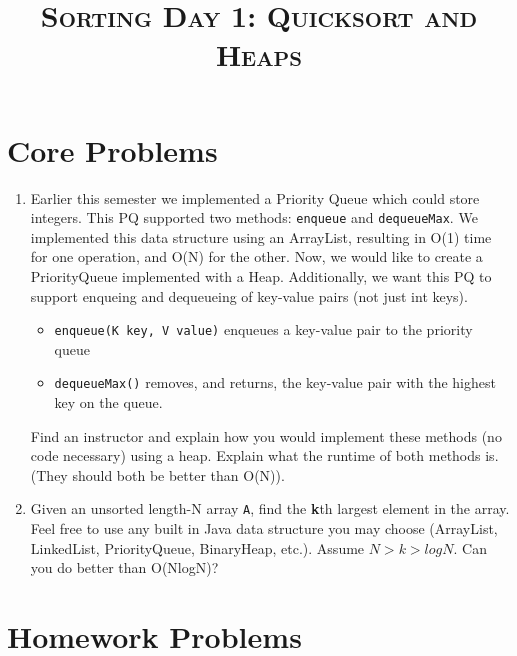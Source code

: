 \documentclass{article}
\title{\large{\textsc{Sorting Day 1: Quicksort and Heaps}}}
\date{}
\begin{document}
\maketitle

\subsection*{}

\section*{Core Problems}

\begin{enumerate}

	\item Earlier this semester we implemented a Priority Queue which could store integers. This PQ supported two methods: \texttt{enqueue} and \texttt{dequeueMax}. We implemented this data structure using an ArrayList, resulting in O(1) time for one operation, and O(N) for the other. Now, we would like to create a PriorityQueue implemented with a Heap. Additionally, we want this PQ to support enqueing and dequeueing of key-value pairs (not just int keys).

	      \begin{itemize}
	      	\item \texttt{enqueue(K key, V value)} enqueues a key-value pair to the priority queue
	      	\item \texttt{dequeueMax()} removes, and returns, the key-value pair with the highest key on the queue.
	      \end{itemize}

	      Find an instructor and explain how you would implement these methods (no code necessary) using a heap. Explain what the runtime of both methods is. (They should both be better than O(N)).

	\item Given an unsorted length-N array \texttt{A}, find the \textbf{k}th largest element in the array. Feel free to use any built in Java data structure you may choose (ArrayList, LinkedList, PriorityQueue, BinaryHeap, etc.). Assume $N > k > logN$. Can you do better than O(NlogN)?

	 \end{enumerate}

	 \section*{Homework Problems}
\end{document}
